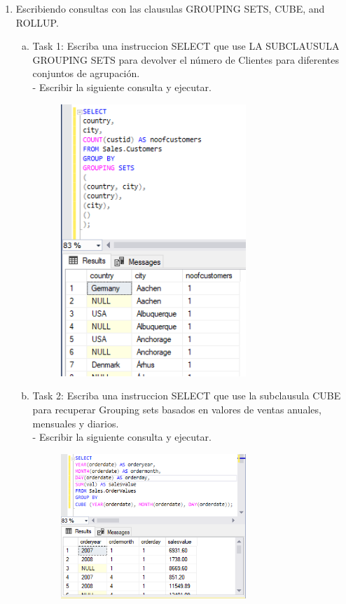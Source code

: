 \begin{enumerate}[1.]
	\item Escribiendo consultas con las clausulas GROUPING SETS, CUBE, and ROLLUP.
	\begin{enumerate}[a)]
	\item Task 1: Escriba una instruccion SELECT que use LA SUBCLAUSULA GROUPING SETS para devolver el número de
Clientes para diferentes conjuntos de agrupación.\\
		-  Escribir la siguiente consulta y ejecutar. 
		\begin{figure}[H]
		\begin{center}
		\includegraphics[width=7cm]{./Imagenes/e3-1}
		\end{center}
		\end{figure}
	\item Task 2: Escriba una instruccion SELECT que use la subclausula CUBE para recuperar Grouping sets basados en valores de ventas anuales, mensuales y diarios.\\
		-  Escribir la siguiente consulta y ejecutar. 
		\begin{figure}[H]
		\begin{center}
		\includegraphics[width=7cm]{./Imagenes/e3-2}

\end{center}
\end{figure}
\end{enumerate}
\end{enumerate}
